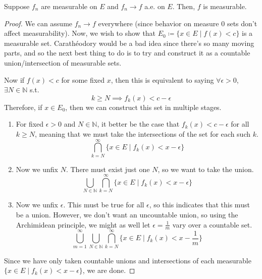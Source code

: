   \begin{theorem}
    Suppose $f_n$ are measurable on $E$ and $f_n \to f$ a.e. on $E$. Then, $f$ is measurable. 
  \end{theorem}
  \begin{proof}
    We can assume $f_n \to f$ everywhere (since behavior on measure $0$ sets don't affect measurability). Now, we wish to show that $E_0 \coloneqq \{x \in E \mid f(x) < c\}$ is a measurable set. Carathéodory would be a bad idea since there's so many moving parts, and so the next best thing to do is to try and construct it as a countable union/intersection of measurable sets. 

    Now if $f(x) < c$ for some fixed $x$, then this is equivalent to saying $\forall \epsilon > 0$, $\exists N \in \mathbb{N}$ s.t. 
    \begin{equation}
      k \geq N \implies f_k (x) < c - \epsilon 
    \end{equation}
    Therefore, if $x \in E_0$, then we can construct this set in multiple stages. 
    \begin{enumerate}
      \item For fixed $\epsilon > 0$ and $N \in \mathbb{N}$, it better be the case that $f_k (x) < c - \epsilon$ for all $k \geq N$, meaning that we must take the intersections of the set for each such $k$. 
      \begin{equation}
        \bigcap_{k = N}^\infty \{ x \in E \mid f_k (x) < x - \epsilon \}
      \end{equation}

      \item Now we unfix $N$. There must exist just one $N$, so we want to take the union. 
      \begin{equation}
        \bigcup_{N \in \mathbb{N}} \bigcap_{k = N}^\infty \{ x \in E \mid f_k (x) < x - \epsilon \}
      \end{equation}

      \item Now we unfix $\epsilon$. This must be true for all $\epsilon$, so this indicates that this must be a union. However, we don't want an uncountable union, so using the Archimidean principle, we might as well let $\epsilon = \frac{1}{m}$ vary over a countable set.  
      \begin{equation}
        \bigcup_{m = 1}^\infty \bigcup_{N \in \mathbb{N}} \bigcap_{k = N}^\infty \{ x \in E \mid f_k (x) < x - \frac{1}{m} \}
      \end{equation}
    \end{enumerate}
    Since we have only taken countable unions and intersections of each measurable $\{x \in E \mid f_k (x) < x - \epsilon\}$, we are done. 
  \end{proof}

